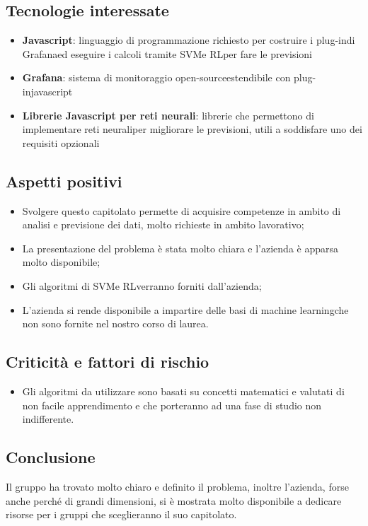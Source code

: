\subsection{Tecnologie interessate}
\begin{itemize}
	\item \textbf{Javascript}: linguaggio di programmazione richiesto per costruire i plug-in\glosp di Grafana\glosp ed eseguire i calcoli tramite SVM\glosp e RL\glosp per fare le previsioni
	\item \textbf{Grafana}: sistema di monitoraggio open-source\glosp estendibile con plug-in\glosp javascript\glo
	\item \textbf{Librerie Javascript per reti neurali}: librerie che permettono di implementare reti neurali\glosp per migliorare le previsioni, utili a soddisfare uno dei requisiti opzionali
\end{itemize}

\subsection{Aspetti positivi}
\begin{itemize} 
	\item Svolgere questo capitolato permette di acquisire competenze in ambito di analisi e previsione dei dati, molto richieste in ambito lavorativo;
	\item La presentazione del problema è stata molto chiara e l'azienda è apparsa molto disponibile;
	\item Gli algoritmi di SVM\glosp e RL\glosp verranno forniti dall'azienda;
  \item L'azienda si rende disponibile a impartire delle basi di machine learning\glosp che non sono fornite nel nostro corso di laurea.
\end{itemize}
\subsection{Criticità e fattori di rischio}
\begin{itemize}
	\item Gli algoritmi da utilizzare sono basati su concetti matematici e valutati di non facile apprendimento e che porteranno ad una fase di studio non indifferente. 
\end{itemize}
\subsection{Conclusione}
Il gruppo ha trovato molto chiaro e definito il problema, inoltre l'azienda, forse anche perché di grandi dimensioni, si è mostrata molto disponibile a dedicare risorse per i gruppi che sceglieranno il suo capitolato.

